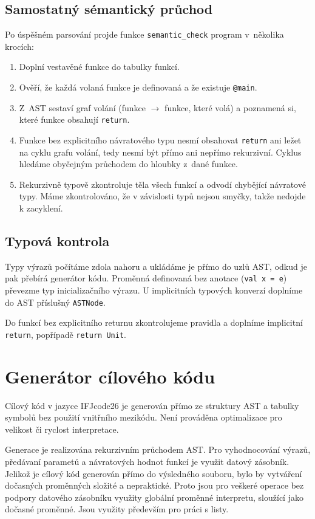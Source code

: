 \documentclass[a4paper,11pt]{article}
\begin{document}
\subsection{Samostatný sémantický průchod}
Po úspěšném parsování projde funkce \texttt{semantic\_check} program
v~několika krocích:

\begin{enumerate}
  \item Doplní vestavěné funkce do tabulky funkcí.
  \item Ověří, že každá volaná funkce je definovaná a že existuje
        \texttt{@main}.
  \item Z~AST sestaví graf volání (funkce $\rightarrow$ funkce, které volá)
        a poznamená si, které funkce obsahují \texttt{return}.
  \item Funkce bez explicitního návratového typu nesmí obsahovat
        \texttt{return} ani ležet na cyklu grafu volání, tedy nesmí být
        přímo ani nepřímo rekurzivní. Cyklus hledáme obyčejným
        průchodem do hloubky z~dané funkce.
  \item Rekurzivně typově zkontroluje těla všech funkcí a odvodí chybějící návratové typy. Máme zkontrolováno, že v závislosti typů nejsou smyčky, takže nedojde k zacyklení.
\end{enumerate}

\subsection{Typová kontrola}
Typy výrazů počítáme zdola nahoru a ukládáme je přímo do uzlů AST, odkud je
pak přebírá generátor kódu. Proměnná definovaná bez anotace
(\texttt{val x = e}) převezme typ inicializačního výrazu. U implicitních typových konverzí doplníme do AST příslušný \texttt{ASTNode}.

Do funkcí bez explicitního returnu zkontrolujeme pravidla a doplníme implicitní \texttt{return}, popřípadě \texttt{return Unit}.

\section{Generátor cílového kódu}
Cílový kód v jazyce IFJcode26 je generován přímo ze struktury AST a tabulky symbolů bez použití vnitřního mezikódu. Není prováděna optimalizace pro velikost či ryclost interpretace.

Generace je realizována rekurzivním průchodem AST. Pro vyhodnocování výrazů, předávaní parametů a návratových hodnot funkcí je využit datový zásobník. Jelikož je cílový kód generován přímo do výsledného souboru, bylo by vytváření dočasných proměnných složité a nepraktické. Proto jsou pro veškeré operace bez podpory datového zásobníku využity globální proměnné interpretu, sloužící jako dočasné proměnné. Jsou využity především pro práci s listy. 
\end{document}
